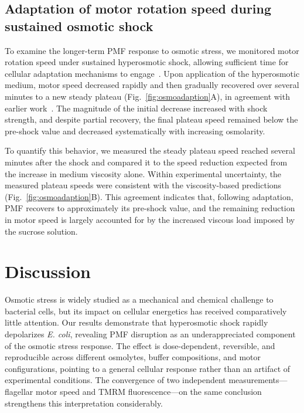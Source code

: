 \documentclass[twocolumn]{biophys-new}%
\begin{document}

\subsection*{Adaptation of motor rotation speed during sustained osmotic shock} To examine the longer-term PMF response to osmotic stress, we monitored motor rotation speed under sustained hyperosmotic shock, allowing sufficient time for cellular adaptation mechanisms to engage~\cite{dinnbier1988transientl,bremer2019responses,wood2010,wood2011bacterial,wood2015}. Upon application of the hyperosmotic medium, motor speed decreased rapidly and then gradually recovered over several minutes to a new steady plateau (Fig.~\ref{fig:osmoadaption}A), in agreement with earlier work~\cite{rosko-2017}. The magnitude of the initial decrease increased with shock strength, and despite partial recovery, the final plateau speed remained below the pre-shock value and decreased systematically with increasing osmolarity.

To quantify this behavior, we measured the steady plateau speed reached several minutes after the shock and compared it to the speed reduction expected from the increase in medium viscosity alone. Within experimental uncertainty, the measured plateau speeds were consistent with the viscosity-based predictions (Fig.~\ref{fig:osmoadaption}B). This agreement indicates that, following adaptation, PMF recovers to approximately its pre-shock value, and the remaining reduction in motor speed is largely accounted for by the increased viscous load imposed by the sucrose solution.

\section*{Discussion}

Osmotic stress is widely studied as a mechanical and chemical challenge to bacterial cells, but its impact on cellular energetics has received comparatively little attention. Our results demonstrate that hyperosmotic shock rapidly depolarizes \textit{E. coli}, revealing PMF disruption as an underappreciated component of the osmotic stress response. The effect is dose-dependent, reversible, and reproducible across different osmolytes, buffer compositions, and motor configurations, pointing to a general cellular response rather than an artifact of experimental conditions. The convergence of two independent measurements---flagellar motor speed and TMRM fluorescence---on the same conclusion strengthens this interpretation considerably.
\end{document}
